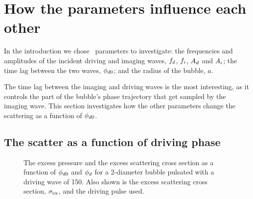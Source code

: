 




\section{How the parameters influence each other}\label{sec:comp:examples}

In the introduction we chose \numparam\ parameters to investigate:
the frequencies and amplitudes of the incident driving and imaging waves,
${f_d}$, ${f_i}$, ${A_d}$ and ${A_i}$;
the time lag between the two waves, ${\phi_{d0}}$;
and the radius of the bubble, $a$.


The time lag between the imaging and driving waves is the most interesting, 
as it controls the part of the bubble's phase trajectory that get sampled by the imaging wave.
This section investigates how the other parameters change the scattering as a function of ${\phi_{d0}}$.


\subsection{The scatter as a function of driving phase} \label{sec:excess_phase}


\begin{figure}
 \centering
  
  \caption{
The excess pressure and the excess scattering cross section as a function of ${\phi_{d0}}$ and ${\phi_d}$
for a \unit{2}\micro\metre-diameter bubble pulsated with a driving wave of \unit{150}\kilo\pascal.
Also shown is the excess scattering cross section, $\sigma_\textrm{ex}$, and the driving pulse used.
  }
 \label{fig:excess_vs_phase}
\end{figure}


